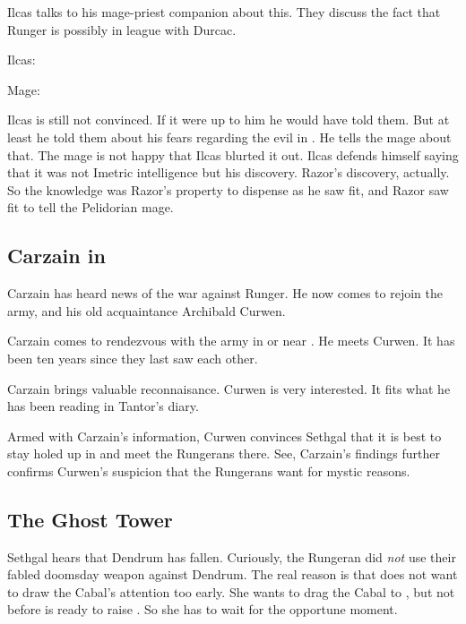 Ilcas talks to his mage-priest companion about this. 
They discuss the fact that Runger is possibly in league with Durcac. 

\begin{prose}
  Ilcas: 
  
  Mage: 
\end{prose}

Ilcas is still not convinced. 
If it were up to him he would have told them. 
But at least he told them about his fears regarding the evil in \Malcur. 
He tells the mage about that. 
The mage is not happy that Ilcas blurted it out. 
Ilcas defends himself saying that it was not Imetric intelligence but his discovery. 
Razor's discovery, actually. 
So the knowledge was Razor's property to dispense as he saw fit, and Razor saw fit to tell the Pelidorian mage. 









\subsection{Carzain in \Forclin}
Carzain \Shireyo{} has heard news of the war against Runger. 
He now comes to rejoin the army, and his old acquaintance Archibald Curwen. 

Carzain comes to rendezvous with the army in or near \Forclin. 
He meets Curwen. 
It has been ten years since they last saw each other. 

Carzain brings valuable reconnaisance. 
Curwen is very interested. 
It fits what he has been reading in Tantor's diary. 

Armed with Carzain's information, Curwen convinces Sethgal that it is best to stay holed up in \Forclin{} and meet the Rungerans there. 
See, Carzain's findings further confirms Curwen's suspicion that the Rungerans want \Forclin{} for mystic reasons. 









\subsection{The Ghost Tower}
Sethgal hears that Dendrum has fallen.
Curiously, the Rungeran \ishrah did \emph{not} use their fabled doomsday weapon against Dendrum. 
The real reason is that \Takestsha does not want to draw the Cabal's attention too early.
She wants to drag the Cabal to \Forclin, but not before \Psyrex is ready to raise \Nithdornazsh.
So she has to wait for the opportune moment. 


